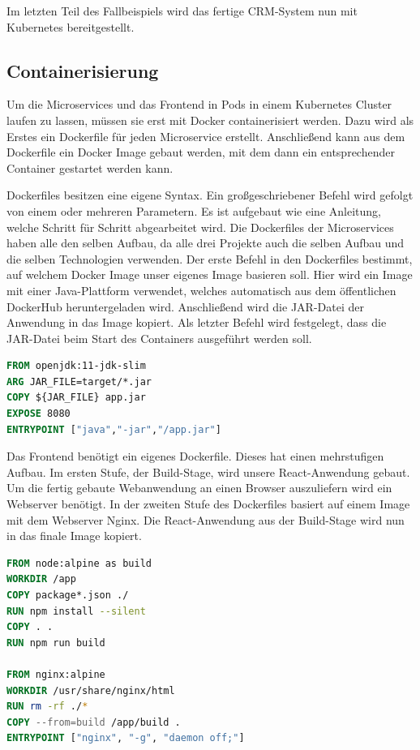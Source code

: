 Im letzten Teil des Fallbeispiels wird das fertige CRM-System nun mit Kubernetes bereitgestellt.

\subsection{Containerisierung}

Um die Microservices und das Frontend in Pods in einem Kubernetes Cluster laufen zu lassen, müssen sie erst mit Docker containerisiert werden. Dazu wird als Erstes ein Dockerfile für jeden Microservice erstellt. Anschließend kann aus dem Dockerfile ein Docker Image gebaut werden, mit dem dann ein entsprechender Container gestartet werden kann.

Dockerfiles besitzen eine eigene Syntax. Ein großgeschriebener Befehl wird gefolgt von einem oder mehreren Parametern. Es ist aufgebaut wie eine Anleitung, welche Schritt für Schritt abgearbeitet wird. Die Dockerfiles der Microservices haben alle den selben Aufbau, da alle drei Projekte auch die selben Aufbau und die selben Technologien verwenden. Der erste Befehl in den Dockerfiles bestimmt, auf welchem Docker Image unser eigenes Image basieren soll. Hier wird ein Image mit einer Java-Plattform verwendet, welches automatisch aus dem öffentlichen DockerHub heruntergeladen wird. Anschließend wird die JAR-Datei der Anwendung in das Image kopiert. Als letzter Befehl wird festgelegt, dass die JAR-Datei beim Start des Containers ausgeführt werden soll.

\begin{lstlisting}[language=dockerfile, caption=Dockerfile für Kontakt-Microservice]
FROM openjdk:11-jdk-slim
ARG JAR_FILE=target/*.jar
COPY ${JAR_FILE} app.jar
EXPOSE 8080
ENTRYPOINT ["java","-jar","/app.jar"]
\end{lstlisting}

Das Frontend benötigt ein eigenes Dockerfile. Dieses hat einen mehrstufigen Aufbau. Im ersten Stufe, der Build-Stage, wird unsere React-Anwendung gebaut. Um die fertig gebaute Webanwendung an einen Browser auszuliefern wird ein Webserver benötigt. In der zweiten Stufe des Dockerfiles basiert auf einem Image mit dem Webserver Nginx. Die React-Anwendung aus der Build-Stage wird nun in das finale Image kopiert.

\begin{lstlisting}[language=dockerfile, caption=Dockerfile für Frontend]
FROM node:alpine as build
WORKDIR /app
COPY package*.json ./
RUN npm install --silent
COPY . .
RUN npm run build

FROM nginx:alpine
WORKDIR /usr/share/nginx/html
RUN rm -rf ./*
COPY --from=build /app/build .
ENTRYPOINT ["nginx", "-g", "daemon off;"]
\end{lstlisting}

